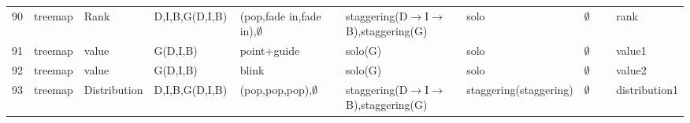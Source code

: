 \begin{landscape}
\begin{longtable}{p{0.035\linewidth}p{0.075\linewidth}p{0.09\linewidth}p{0.13\linewidth}p{0.19\linewidth}p{0.22\linewidth}p{0.13\linewidth}p{0.075\linewidth}p{0.08\linewidth}}
90 & treemap & Rank & D,I,B,G(D,I,B) & (pop,fade in,fade in),$\emptyset$ & staggering(D$\rightarrow$I$\rightarrow$B),staggering(G) & solo & $\emptyset$ & rank \\
91 & treemap & value & G(D,I,B) & point+guide & solo(G) & solo & $\emptyset$ & value1 \\
92 & treemap & value & G(D,I,B) & blink & solo(G) & solo & $\emptyset$ & value2 \\
93 & treemap & Distribution & D,I,B,G(D,I,B) & (pop,pop,pop),$\emptyset$ & staggering(D$\rightarrow$I$\rightarrow$B),staggering(G) & staggering(staggering) & $\emptyset$ & distribution1 \\
\end{longtable}
\normalsize
\end{landscape}
